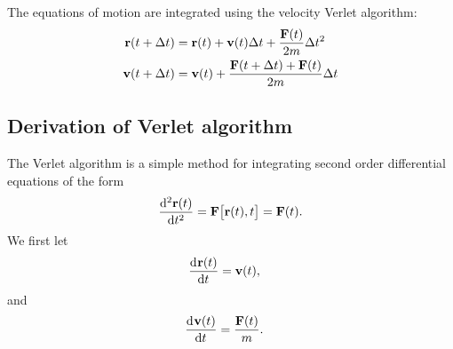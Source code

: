 

The equations of motion are integrated using the velocity Verlet algorithm:
\begin{align*}
    \mathbf{r}(t + \Delta t) &= \mathbf{r}(t) + \mathbf{v}(t)\Delta t + \frac{\mathbf{F}(t)}{2m}\Delta t^2 \\
    \mathbf{v}(t + \Delta t) &= \mathbf{v}(t) + \frac{\mathbf{F}(t + \Delta t) + \mathbf{F}(t)}{2m}\Delta t
\end{align*}


\subsection{Derivation of Verlet algorithm}
The Verlet algorithm\cite{verlet1967computer} is a simple method for integrating second order differential equations of the form 
\begin{align*}
    \dod[2]{\rvec(t)}{t} = \Fvec\big[\rvec(t), t\big] = \Fvec(t).
\end{align*}
We first let
\begin{align*}
    \dod{\rvec(t)}{t} &= \vvec(t),
\end{align*}
and
\begin{align*}
    \dod{\vvec(t)}{t} &= \frac{\Fvec(t)}{m}.
\end{align*}


